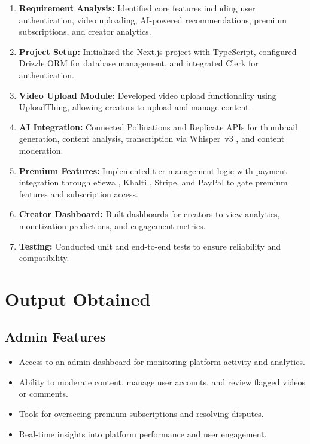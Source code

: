 \begin{enumerate}[leftmargin=2cm]
  \item \textbf{Requirement Analysis:} Identified core features including user authentication, video uploading, AI-powered recommendations, premium subscriptions, and creator analytics.

  \item \textbf{Project Setup:} Initialized the Next.js project with TypeScript, configured Drizzle ORM for database management, and integrated Clerk for authentication.

  \item \textbf{Video Upload Module:} Developed video upload functionality using UploadThing, allowing creators to upload and manage content.

  \item \textbf{AI Integration:} Connected Pollinations \cite{pollinations2024api} and Replicate \cite{replicate2024whisper} APIs for thumbnail generation, content analysis, transcription via Whisper~v3 \cite{radford2023whisper}, and content moderation.

  \item \textbf{Premium Features:} Implemented tier management logic with payment integration through eSewa \cite{esewa2024}, Khalti \cite{khalti2024}, Stripe, and PayPal to gate premium features and subscription access.

  \item \textbf{Creator Dashboard:} Built dashboards for creators to view analytics, monetization predictions, and engagement metrics.

  \item \textbf{Testing:} Conducted unit and end-to-end tests to ensure reliability and compatibility.
\end{enumerate}

\section{Output Obtained}

\subsection{Admin Features}
\begin{itemize}[leftmargin=2cm]
  \item Access to an admin dashboard for monitoring platform activity and analytics.
  \item Ability to moderate content, manage user accounts, and review flagged videos or comments.
  \item Tools for overseeing premium subscriptions and resolving disputes.
  \item Real-time insights into platform performance and user engagement.
\end{itemize}


